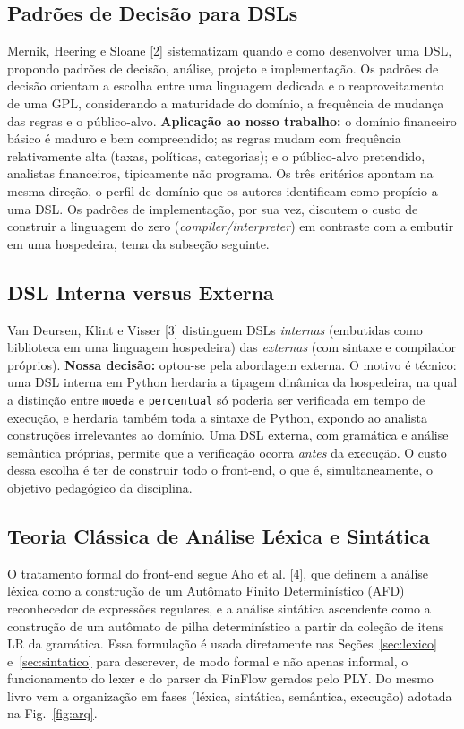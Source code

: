 \documentclass[conference]{IEEEtran}
\begin{document}
\subsection{Padrões de Decisão para DSLs}

Mernik, Heering e Sloane [2] sistematizam quando e como desenvolver uma DSL, propondo padrões de decisão, análise, projeto e implementação. Os padrões de decisão orientam a escolha entre uma linguagem dedicada e o reaproveitamento de uma GPL, considerando a maturidade do domínio, a frequência de mudança das regras e o público-alvo. \textbf{Aplicação ao nosso trabalho:} o domínio financeiro básico é maduro e bem compreendido; as regras mudam com frequência relativamente alta (taxas, políticas, categorias); e o público-alvo pretendido, analistas financeiros, tipicamente não programa. Os três critérios apontam na mesma direção, o perfil de domínio que os autores identificam como propício a uma DSL. Os padrões de implementação, por sua vez, discutem o custo de construir a linguagem do zero (\textit{compiler/interpreter}) em contraste com a embutir em uma hospedeira, tema da subseção seguinte.

\subsection{DSL Interna versus Externa}

Van Deursen, Klint e Visser [3] distinguem DSLs \textit{internas} (embutidas como biblioteca em uma linguagem hospedeira) das \textit{externas} (com sintaxe e compilador próprios). \textbf{Nossa decisão:} optou-se pela abordagem externa. O motivo é técnico: uma DSL interna em Python herdaria a tipagem dinâmica da hospedeira, na qual a distinção entre \texttt{moeda} e \texttt{percentual} só poderia ser verificada em tempo de execução, e herdaria também toda a sintaxe de Python, expondo ao analista construções irrelevantes ao domínio. Uma DSL externa, com gramática e análise semântica próprias, permite que a verificação ocorra \textit{antes} da execução. O custo dessa escolha é ter de construir todo o front-end, o que é, simultaneamente, o objetivo pedagógico da disciplina.

\subsection{Teoria Clássica de Análise Léxica e Sintática}

O tratamento formal do front-end segue Aho et al. [4], que definem a análise léxica como a construção de um Autômato Finito Determinístico (AFD) reconhecedor de expressões regulares, e a análise sintática ascendente como a construção de um autômato de pilha determinístico a partir da coleção de itens LR da gramática. Essa formulação é usada diretamente nas Seções~\ref{sec:lexico} e~\ref{sec:sintatico} para descrever, de modo formal e não apenas informal, o funcionamento do lexer e do parser da FinFlow gerados pelo PLY. Do mesmo livro vem a organização em fases (léxica, sintática, semântica, execução) adotada na Fig.~\ref{fig:arq}.
\end{document}
